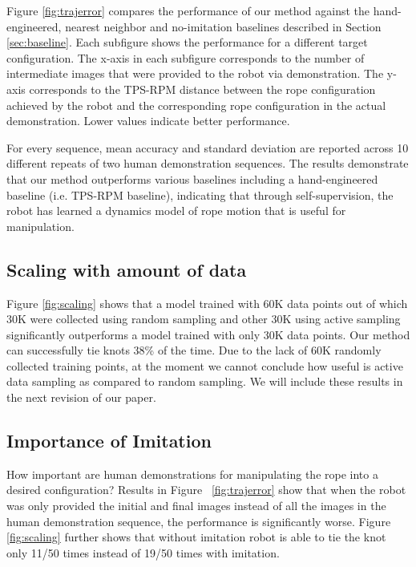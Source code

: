\documentclass[letterpaper, 10 pt, conference]{ieeeconf}  %
\begin{document}
Figure \ref{fig:trajerror} compares the performance of our method against the hand-engineered, nearest neighbor and no-imitation baselines described in Section \ref{sec:baseline}. Each subfigure shows the performance for a different target configuration.
The x-axis in each subfigure corresponds to the number of intermediate images that were provided to the robot via demonstration. The y-axis corresponds to the TPS-RPM distance between the rope configuration achieved by the robot and the corresponding rope configuration in the actual demonstration. Lower values indicate better performance. 

For every sequence, mean accuracy and standard deviation are reported across 10 different repeats of two human demonstration sequences. The results demonstrate that our method outperforms various baselines including a hand-engineered baseline (i.e. TPS-RPM baseline), indicating that through self-supervision, the robot has learned a dynamics model of rope motion that is useful for manipulation.

\subsection{Scaling with amount of data}
Figure \ref{fig:scaling} shows that a model trained with 60K data points out of which 30K were collected using random sampling and other 30K using active sampling significantly outperforms a model trained with only 30K data points. Our method can successfully tie knots 38\% of the time. Due to the lack of 60K randomly collected training points, at the moment we cannot conclude how useful is active data sampling as compared to random sampling. We will include these results in the next revision of our paper. 

\subsection{Importance of Imitation} 
How important are human demonstrations for manipulating the rope into a desired configuration? Results in Figure ~\ref{fig:trajerror} show that when the robot was only provided the initial and final images instead of all the images in the human demonstration sequence, the performance is significantly worse. Figure \ref{fig:scaling} further shows that without imitation robot is able to tie the knot only 11/50 times instead of 19/50 times with imitation. 
\end{document}
